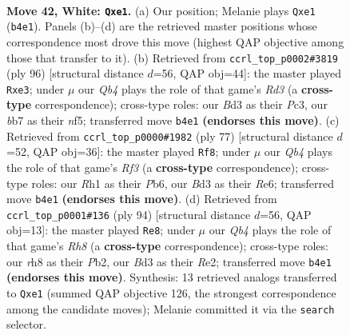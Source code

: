 \documentclass[11pt]{article}
\begin{document}
\clearpage

\begin{figure}[p]\centering
\begin{subfigure}{0.46\textwidth}\centering
\resizebox{\linewidth}{!}{%
\newchessgame
\chessboard[
  setfen={7r/1b3k2/8/8/1Q5p/3B3P/1p4P1/4r1KR w - - 0 42},
  showmover=false,
  pgfstyle=straightmove, color=movearrow, markmove={b4-e1}
]}
\caption{}
\end{subfigure}\hfill
\begin{subfigure}{0.46\textwidth}\centering
\resizebox{\linewidth}{!}{%
\newchessgame
\chessboard[
  setfen={2r5/5k2/p7/P4np1/1P6/2PRr3/4K3/4R3 w - - 0 49},
  showmover=false,
  pgfstyle=straightmove, color=movearrow, markmove={d3-e3}
]}
\caption{}
\end{subfigure}
\\[4pt]
\begin{subfigure}{0.46\textwidth}\centering
\resizebox{\linewidth}{!}{%
\newchessgame
\chessboard[
  setfen={2R3k1/6p1/1p2rrP1/6R1/1p6/P7/8/1K6 b - - 1 39},
  showmover=false,
  pgfstyle=straightmove, color=movearrow, markmove={f6-f8}
]}
\caption{}
\end{subfigure}\hfill
\begin{subfigure}{0.46\textwidth}\centering
\resizebox{\linewidth}{!}{%
\newchessgame
\chessboard[
  setfen={7R/k2B4/3p4/p1r1b3/8/2P5/1PK1R3/5r2 w - - 2 48},
  showmover=false,
  pgfstyle=straightmove, color=movearrow, markmove={h8-e8}
]}
\caption{}
\end{subfigure}
\caption{\textbf{Move 42, White: \texttt{Qxe1}.} (a) Our position; Melanie plays \texttt{Qxe1} (\texttt{b4e1}). Panels (b)--(d) are the retrieved master positions whose correspondence most drove this move (highest QAP objective among those that transfer to it). (b) Retrieved from \texttt{ccrl\_top\_p0002\#3819} (ply 96) [structural distance $d$=56, QAP obj=44]: the master played \texttt{Rxe3}; under $\mu$ our \emph{Qb4} plays the role of that game's \emph{Rd3} (a \textbf{cross-type} correspondence); cross-type roles: our \emph{B}d3 as their \emph{P}c3, our \emph{b}b7 as their \emph{n}f5; transferred move \texttt{b4e1} \textbf{(endorses this move)}. (c) Retrieved from \texttt{ccrl\_top\_p0000\#1982} (ply 77) [structural distance $d$=52, QAP obj=36]: the master played \texttt{Rf8}; under $\mu$ our \emph{Qb4} plays the role of that game's \emph{Rf3} (a \textbf{cross-type} correspondence); cross-type roles: our \emph{R}h1 as their \emph{P}b6, our \emph{B}d3 as their \emph{R}e6; transferred move \texttt{b4e1} \textbf{(endorses this move)}. (d) Retrieved from \texttt{ccrl\_top\_p0001\#136} (ply 94) [structural distance $d$=56, QAP obj=13]: the master played \texttt{Re8}; under $\mu$ our \emph{Qb4} plays the role of that game's \emph{Rh8} (a \textbf{cross-type} correspondence); cross-type roles: our \emph{r}h8 as their \emph{P}b2, our \emph{B}d3 as their \emph{R}e2; transferred move \texttt{b4e1} \textbf{(endorses this move)}. Synthesis: 13 retrieved analogs transferred to \texttt{Qxe1} (summed QAP objective 126, the strongest correspondence among the candidate moves); Melanie committed it via the \texttt{search} selector.}
\label{fig:thought-m82}
\end{figure}
\end{document}
